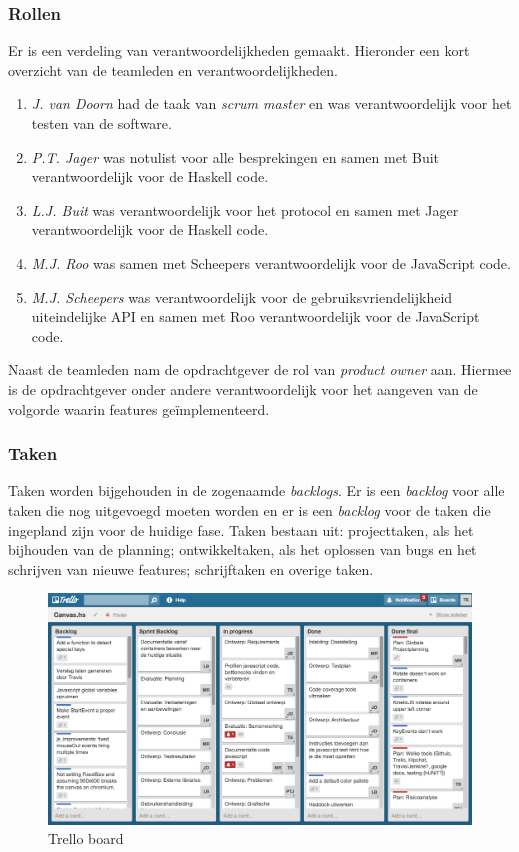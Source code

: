 \subsubsection{Rollen}
Er is een verdeling van verantwoordelijkheden gemaakt. Hieronder een kort overzicht van de teamleden en verantwoordelijkheden.
\begin{enumerate}
    \item \emph{J. van Doorn} had de taak van \emph{scrum master} en was verantwoordelijk voor het testen van de software.
    \item \emph{P.T. Jager} was notulist voor alle besprekingen en samen met Buit verantwoordelijk voor de Haskell code.
    \item \emph{L.J. Buit} was verantwoordelijk voor het protocol en samen met Jager verantwoordelijk voor de Haskell code.
    \item \emph{M.J. Roo} was samen met Scheepers verantwoordelijk voor de JavaScript code.
    \item \emph{M.J. Scheepers} was verantwoordelijk voor de gebruiksvriendelijkheid uiteindelijke API en samen met Roo verantwoordelijk voor de JavaScript code.
\end{enumerate}
Naast de teamleden nam de opdrachtgever de rol van \emph{product owner} aan. Hiermee is de opdrachtgever onder andere verantwoordelijk voor het aangeven van de volgorde waarin features ge\"implementeerd.

\subsubsection{Taken}
Taken worden bijgehouden in de zogenaamde \emph{backlogs}. Er is een \emph{backlog} voor alle taken die nog uitgevoegd moeten worden en er is een \emph{backlog} voor de taken die ingepland zijn voor de huidige fase. Taken bestaan uit: projecttaken, als het bijhouden van de planning; ontwikkeltaken, als het oplossen van bugs en het schrijven van nieuwe features; schrijftaken en overige taken.

\begin{figure}[H]
\begin{center}
\includegraphics[keepaspectratio,width=\textwidth]{./images/trello.png}
\caption{Trello board}
\label{fig:trello}
\end{center}
\end{figure}

